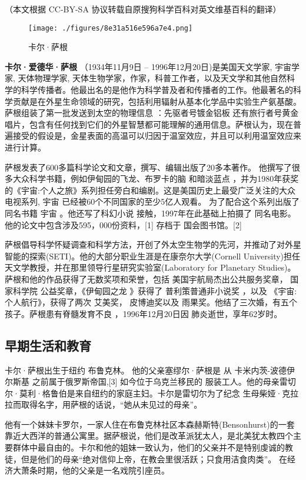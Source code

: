 
（本文根据 CC-BY-SA 协议转载自原搜狗科学百科对英文维基百科的翻译）
\begin{figure}[ht]
\centering
\texttt{[image: ./figures/8e31a516e596a7e4.png]}
\caption{卡尔·萨根} \label{fig_Sagan_12}
\end{figure}
\textbf{卡尔·爱德华·萨根} （1934年11月9日 – 1996年12月20日)是美国天文学家, 宇宙学家, 天体物理学家, 天体生物学家，作家，科普工作者，以及天文学和其他自然科学的科学传播者。他最出名的是他作为科学普及者和传播者的工作。他最著名的科学贡献是在外星生命领域的研究，包括利用辐射从基本化学品中实验生产氨基酸。萨根组装了第一批发送到太空的物理信息 ：先驱者号镀金铝板 还有旅行者号黄金唱片，包含有任何找到它们的外星智慧都可能理解的通用信息。萨根认为，现在普遍接受的假设是，金星表面的高温可以归因于温室效应，并且可以利用温室效应来进行计算。

萨根发表了600多篇科学论文和文章，撰写、编辑出版了20多本著作。 他撰写了很多大众科学书籍，例如伊甸园的飞龙、布罗卡的脑 和暗淡蓝点 ，并为1980年获奖的《宇宙:个人之旅》系列担任旁白和编剧。这是美国历史上最受广泛关注的大众电视系列, 宇宙 已经被60个不同国家的至少5亿人观看。 为了配合这个系列出版了同名书籍 宇宙 。他还写了科幻小说 接触，1997年在此基础上拍摄了 同名电影。他的论文中包含涉及595，000份资料，[1] 存档于 国会图书馆。[2]

萨根倡导科学怀疑调查和科学方法，开创了外太空生物学的先河，并推动了对外星智能的探索(SETI)。他的大部分职业生涯是在康奈尔大学(Cornell University)担任天文学教授，并在那里领导行星研究实验室(Laboratory for Planetary Studies)。萨根和他的作品获得了无数奖项和荣誉，包括 美国宇航局杰出公共服务奖章， 国家科学院 公益奖章，《伊甸园之龙 》获得了 普利策普通非小说奖 ，以及 《宇宙:个人航行》，获得了两次 艾美奖， 皮博迪奖以及 雨果奖。他结了三次婚，有五个孩子。萨根患有脊髓发育不良 ，1996年12月20日因 肺炎逝世，享年62岁时。

\subsection{早期生活和教育}
卡尔·萨根出生于纽约 布鲁克林。 他的父亲塞缪尔·萨根是 从 卡米内茨-波德伊尔斯基 之前属于俄罗斯帝国,[3] 如今位于乌克兰移民的 服装工人。他的母亲雷切尔·莫利·格鲁伯是来自纽约的家庭主妇。卡尔是雷切尔为了纪念 生母柴娅·克拉拉而取得名字，用萨根的话说，“她从未见过的母亲”。

他有一个妹妹卡罗尔，一家人住在布鲁克林社区本森赫斯特(Bensonhurst)的一套靠近大西洋的普通公寓里。据萨根说，他们是改革派犹太人，是北美犹太教四个主要群体中最自由的。卡尔和他的姐妹一致认为，他们的父亲并不是特别虔诚的教徒，但是他们的母亲“绝对信仰上帝，在教会里很活跃；只食用洁食肉类”。 在经济大萧条时期，他的父亲是一名戏院引座员。

